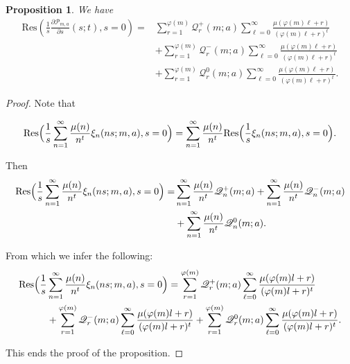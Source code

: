 \documentclass[12pt]{amsart}
\newtheorem{proposition}[theorem]{Proposition}
\newcommand{\vf}{\varphi}
\newcommand{\pt}{\partial}
\begin{document}
\begin{proposition}\label{prop4.111} 
We have
\begin{equation*}
\begin{split}
\mathrm{Res}\left( \frac{1}{s} \frac{\pt \mathcal{P}_{m,a}}{\pt s}(s; t), s=0 \right)
= &\sum_{r=1}^{\varphi(m)} \mathscr{Q}_r^+(m; a) \sum_{\ell=0}^\infty \frac{\mu(\varphi(m)\ell + r)}{(\varphi(m)\ell + r)^t} \\
&+ \sum_{r=1}^{\varphi(m)} \mathscr{Q}_r^-(m; a) \sum_{\ell=0}^\infty \frac{\mu(\varphi(m)\ell + r)}{(\varphi(m)\ell + r)^t} \\
&+ \sum_{r=1}^{\varphi(m)} \mathscr{Q}_r^0(m; a) \sum_{\ell=0}^\infty \frac{\mu(\varphi(m)\ell + r)}{(\varphi(m)\ell + r)^t}.
\end{split}
\end{equation*}
\end{proposition}
\begin{proof}


Note that

\[
\mathrm{Res}\Bigl(\frac{1}{s}\sum_{n=1}^\infty \frac{\mu(n)}{n^t} 
\xi_n(ns;m,a),s=0 \Bigr)=\sum_{n=1}^\infty \frac{\mu(n)}{n^t} 
\mathrm{Res}\Bigl(\frac{1}{s}
\xi_n(ns;m,a),s=0 \Bigr).
\]

Then
\[
\begin{split}
\mathrm{Res}\Bigl(\frac{1}{s}\sum_{n=1}^\infty \frac{\mu(n)}{n^t} 
\xi_n(ns;m,a),s=0 \Bigr)=&\sum_{n=1}^\infty \frac{\mu(n)}{n^t}\mathscr{Q}_n^+(m;a) 
+\sum_{n=1}^\infty\frac{\mu(n)}{n^t} \mathscr{Q}_n^-(m;a)  \\
&+\sum_{n=1}^\infty \frac{\mu(n)}{n^t} \mathscr{Q}_n^0(m;a).
\end{split}
\]



From which we infer the following:
\[
\begin{split}
\mathrm{Res}\Bigl(\frac{1}{s}&\sum_{n=1}^\infty \frac{\mu(n)}{n^t} 
\xi_n(ns;m,a),s=0 \Bigr)=\sum_{r=1}^{\vf(m)} \mathscr{Q}_r^+(m;a)
  \sum_{\ell=0}^\infty \frac{\mu(\vf(m)l+r)}{(\vf(m)l+r)^t}  \\
&+\sum_{r=1}^{\vf(m)}  \mathscr{Q}_r^-(m;a)\sum_{\ell=0}^\infty \frac{\mu(\vf(m)l+r)}{(\vf(m)l+r)^t} +\sum_{r=1}^{\vf(m)} \mathscr{Q}_r^0(m;a)  \sum_{\ell=0}^\infty \frac{\mu(\vf(m)l+r)}{(\vf(m)l+r)^t}.
\end{split}
\]

This ends the proof of the proposition.
\end{proof}
\end{document}
